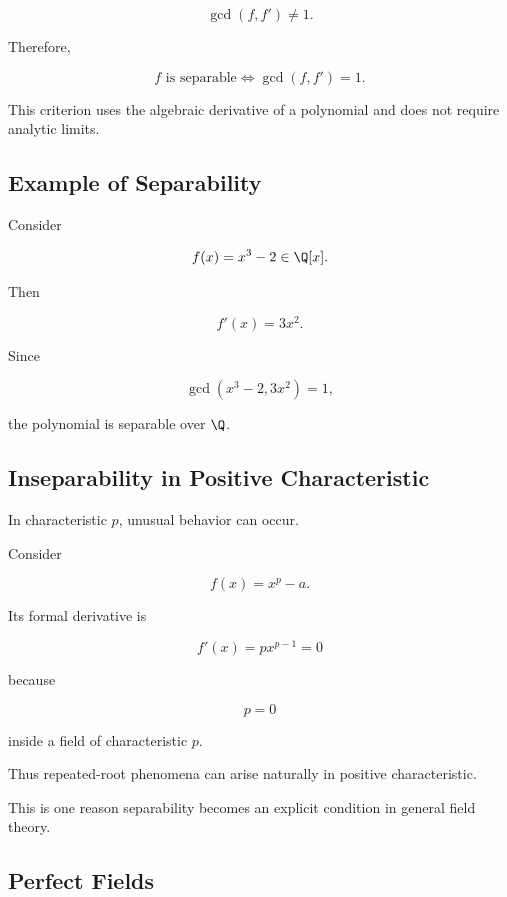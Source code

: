 \[ \gcd(f,f')\neq1. \]

Therefore,

\[ f\text{ is separable}\iff\gcd(f,f')=1. \]

This criterion uses the algebraic derivative of a polynomial and does not
require analytic limits.

\subsection{Example of Separability}
\label{subsec:separable-example}

Consider

\[ f(x)=x^3-2\in\Q[x]. \]

Then

\[ f'(x)=3x^2. \]

Since

\[ \gcd(x^3-2,3x^2)=1, \]

the polynomial is separable over \(\Q\).

\subsection{Inseparability in Positive Characteristic}
\label{subsec:inseparable-positive-characteristic}

In characteristic \(p\), unusual behavior can occur.

Consider

\[ f(x)=x^p-a. \]

Its formal derivative is

\[ f'(x)=px^{p-1}=0 \]

because

\[ p=0 \]

inside a field of characteristic \(p\).

Thus repeated-root phenomena can arise naturally in positive
characteristic.

This is one reason separability becomes an explicit condition in general
field theory.

\subsection{Perfect Fields}
\label{subsec:perfect-fields}

